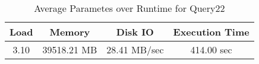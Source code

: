 \documentclass[../../main.tex]{subfiles}
\begin{document}
    \begin{table}
        \begin{center}
            \begin{tabular}{ |c|c|c|c| } 
            \hline
            Load & Memory & Disk IO & Execution Time\\
            \hline
            3.10 & 39518.21 MB & 28.41 MB/sec & 414.00 sec \\
            \hline
            \end{tabular}
            \\[1pt]
            \caption{Average Parametes over Runtime for Query22}
        \end{center}
    \end{table}
    \pagebreak
\end{document}
